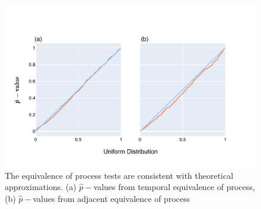 \begin{figure}[!htb]
\centering
\includegraphics[width=\textwidth]{figures/plots/synthetic/adj-temp_eop/High JSD, High Entropy.pdf}
\caption{The equivalence of process tests are consistent with theoretical approximations. (a) $\hat p-$values from temporal equivalence of process, (b) $\hat p-$values from adjacent equivalence of process}
\label{fig:synthetic/adj-temp_eop/HighJSDHighEntropy}
\end{figure}